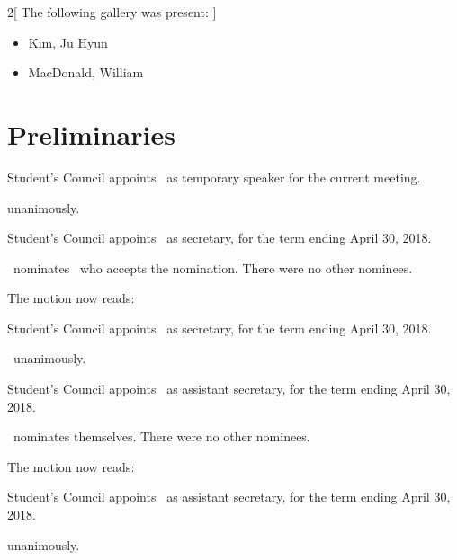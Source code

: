 \documentclass[12pt, letterpaper]{article}
\begin{document}
\begin{multicols}{2}[
        The following gallery was present:
    ]
\begin{itemize}
    \item Kim, Ju Hyun     
    \item MacDonald, William
\end{itemize}
\end{multicols}

\noindent

\section*{Preliminaries}

\begin{information}
\end{information}

\begin{motion}
    \birt Student's Council appoints \andrewc\ as temporary speaker for the 
    current meeting.
    \movers{\brian}{\ben}

    \carries unanimously.
\end{motion}

\speaker{\andrewc}

\begin{motion}
    \birt Student's Council appoints \blank\ as secretary, for the term 
    ending April 30, 2018.
    \movers{\brian}{\antonio}
    
    \brian\ nominates \tristan\, who accepts the nomination. There were no 
    other nominees.

    The motion now reads:

    \birt Student's Council appoints \tristan\ as secretary, for the term 
    ending April 30, 2018.

    \carries\ unanimously.
\end{motion}

\secretary{\tristan}

\begin{motion}
    \birt Student's Council appoints \blank\ as assistant secretary, for the
    term ending April 30, 2018. 
    \movers{\brian}{\tristan}

    \wenyu\ nominates themselves. There were no other nominees. 

    The motion now reads:

    \birt Student's Council appoints \wenyu\ as assistant secretary, for the
    term ending April 30, 2018. 

    \carries unanimously. 
\end{motion}
\end{document}
